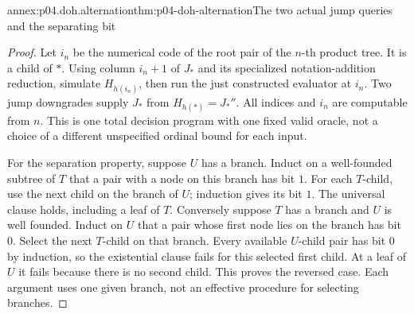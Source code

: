 \begin{annexitem}{annex:p04.doh.alternation}{thm:p04-doh-alternation}{The two actual jump queries and the separating bit}
\begin{proof}
Let \(i_n\) be the numerical code of the root pair of the \(n\)-th
product tree. It is a child of \(*\). Using column \(i_n+1\) of
\(J_*\) and its specialized notation-addition reduction, simulate
\(H_{h(i_n)}\), then run the just constructed evaluator at \(i_n\).
Two jump downgrades supply \(J_*\) from \(H_{h(*)}=J_*''\).
All indices and \(i_n\) are computable from \(n\). This is one
total decision program with one fixed valid oracle, not a choice
of a different unspecified ordinal bound for each input.

For the separation property, suppose \(U\) has a branch. Induct
on a well-founded subtree of \(T\) that a pair with a node on
this branch has bit \(1\). For each \(T\)-child, use the next
child on the branch of \(U\); induction gives its bit \(1\).
The universal clause holds, including a leaf of \(T\).
Conversely suppose \(T\) has a branch and \(U\) is well founded.
Induct on \(U\) that a pair whose first node lies on the branch
has bit \(0\). Select the next \(T\)-child on that branch.
Every available \(U\)-child pair has bit \(0\) by induction,
so the existential clause fails for this selected first child.
At a leaf of \(U\) it fails because there is no second child.
This proves the reversed case. Each argument uses one given branch,
not an effective procedure for selecting branches.
\end{proof}
\end{annexitem}

